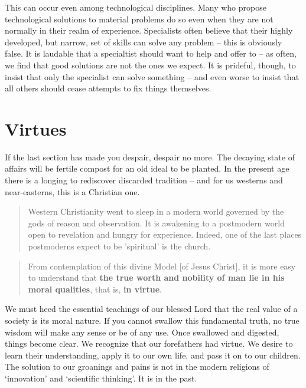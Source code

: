 \documentclass[letterpaper]{article}
\begin{document}
    This can occur even among technological disciplines. Many who propose technological solutions to material problems do so even when they are not normally in their realm of experience. Specialists often believe that their highly developed, but narrow, set of skills can solve any problem -- this is obviously false. It is laudable that a specialtist should want to help and offer to -- as often, we find that good solutions are not the ones we expect. It is prideful, though, to insist that only the specialist can solve something -- and even worse to insist that all others should cease attempts to fix things themselves.

\section{Virtues}

  If the last section has made you despair, despair no more. The decaying state of affairs will be fertile compost for an old ideal to be planted. In the present age there is a longing to rediscover discarded tradition -- and for us westerns and near-easterns, this is a Christian one.

  \begin{quote}
    Western Christianity went to sleep in a modern world governed by the gods of reason and observation. It is awakening to a postmodern world open to revelation and hungry for experience. Indeed, one of the last places postmoderns expect to be 'spiritual' is the church.
  \end{quote}


  \begin{quote}
    From contemplation of this divine Model [of Jesus Christ], it is more easy to understand that \textbf{the true worth and nobility of man lie in his moral qualities}, that is, \textbf{in virtue}.
  \end{quote}

  We must heed the essential teachings of our blessed Lord that the real value of a society is its moral nature. If you cannot swallow this fundamental truth, no true wisdom will make any sense or be of any use. Once swallowed and digested, things become clear. We recognize that our forefathers had virtue. We desire to learn their understanding, apply it to our own life, and pass it on to our children. The solution to our groanings and pains is not in the modern religions of `innovation' and `scientific thinking'. It is in the past.
\end{document}
